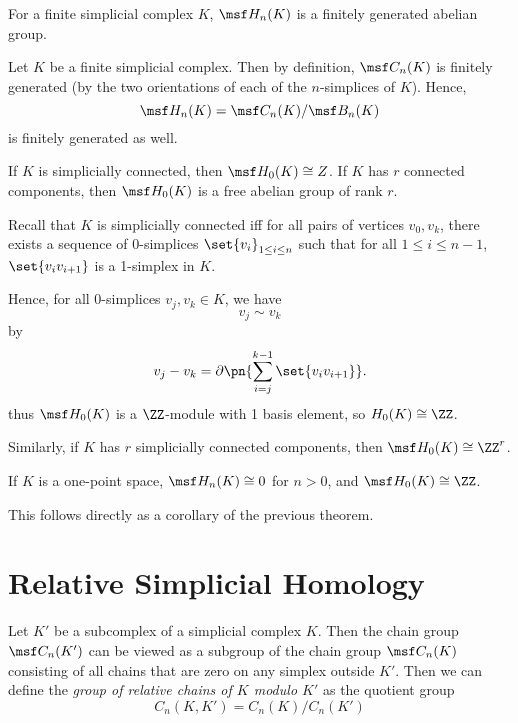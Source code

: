 \begin{problem}[18.7]
  For a finite simplicial complex $K$, $\msf H_n(K)$ is a finitely
  generated abelian group.
\end{problem}
\begin{solution}
  Let $K$ be a finite simplicial complex. Then by definition, $\msf
  C_n(K)$ is finitely generated (by the two orientations of each of
  the $n$-simplices of $K$). Hence,
  \[
    \msf H_n(K) = \msf C_n(K)/\msf B_n(K)
  \]
  is finitely generated as well.
\end{solution}
\begin{problem}[18.8]
  If $K$ is simplicially connected, then $\msf H_0(K) \cong Z$. If $K$
  has $r$ connected components, then $\msf H_0(K)$ is a free abelian
  group of rank $r$.
\end{problem}
\begin{solution}
  Recall that $K$ is simplicially connected iff for all pairs of
  vertices $v_0, v_k$, there exists a sequence of 0-simplices
  $\set{v_i}_{1 \leq i \leq n}$ such that for all $1 \leq i \leq n-1$,
  $\set{v_iv_{i+1}}$ is a 1-simplex in $K$.

  Hence, for all 0-simplices $v_j, v_k \in K$, we have
  \[
    v_j \sim v_k
  \]
  by
  \[
    v_j - v_k = \partial\pn{\sum_{i=j}^{k-1} \set{v_iv_{i+1}}}.
  \]
  thus $\msf H_0(K)$ is a $\ZZ$-module with 1 basis element, so
  $H_0(K) \cong \ZZ$.

  Similarly, if $K$ has $r$ simplicially connected components, then
  $\msf H_0(K) \cong \ZZ^r$.
\end{solution}
\begin{problem}[18.9]
  If $K$ is a one-point space, $\msf H_n(K) \cong 0$ for $n > 0$, and
  $\msf H_0(K) \cong \ZZ$.
\end{problem}
\begin{solution}
  This follows directly as a corollary of the previous theorem.
\end{solution}

\section{Relative Simplicial Homology}
\begin{definition}
  Let $K'$ be a subcomplex of a simplicial complex $K$. Then the chain
  group $\msf C_n(K')$ can be viewed as a subgroup of the chain group
  $\msf C_n(K)$ consisting of all chains that are zero on any simplex
  outside $K'$. Then we can define the \emph{group of relative chains
    of $K$ modulo $K'$} as the quotient group
  \[
    C_n(K, K') = C_n(K)/C_n(K')
  \]
\end{definition}


